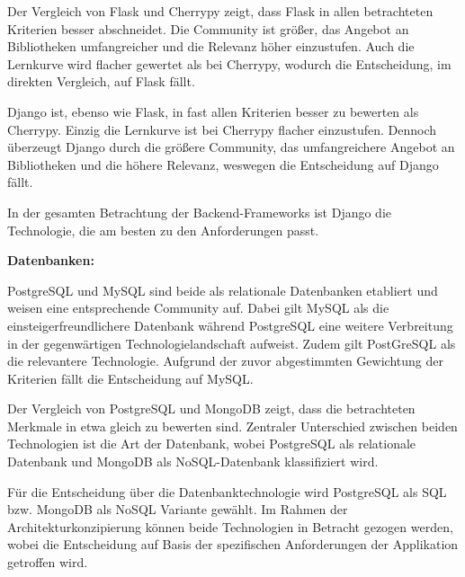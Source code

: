 Der Vergleich von Flask und Cherrypy zeigt, dass Flask in allen betrachteten Kriterien besser abschneidet.
Die Community ist größer, das Angebot an Bibliotheken umfangreicher und die Relevanz höher einzustufen.
Auch die Lernkurve wird flacher gewertet als bei Cherrypy, wodurch die Entscheidung, im direkten Vergleich, auf Flask fällt.

Django ist, ebenso wie Flask, in fast allen Kriterien besser zu bewerten als Cherrypy.
Einzig die Lernkurve ist bei Cherrypy flacher einzustufen.
Dennoch überzeugt Django durch die größere Community, das umfangreichere Angebot an Bibliotheken und die höhere Relevanz, weswegen die Entscheidung auf Django fällt.

In der gesamten Betrachtung der Backend-Frameworks ist Django die Technologie, die am besten zu den Anforderungen passt.

\textbf{Datenbanken:}

PostgreSQL und MySQL sind beide als relationale Datenbanken etabliert und weisen eine entsprechende Community auf.
Dabei gilt MySQL als die einsteigerfreundlichere Datenbank während PostgreSQL eine weitere Verbreitung in der gegenwärtigen Technologielandschaft aufweist.
Zudem gilt PostGreSQL als die relevantere Technologie.
Aufgrund der zuvor abgestimmten Gewichtung der Kriterien fällt die Entscheidung auf MySQL.

Der Vergleich von PostgreSQL und MongoDB zeigt, dass die betrachteten Merkmale in etwa gleich zu bewerten sind.
Zentraler Unterschied zwischen beiden Technologien ist die Art der Datenbank, wobei PostgreSQL als relationale Datenbank und MongoDB als NoSQL-Datenbank klassifiziert wird.

Für die Entscheidung über die Datenbanktechnologie wird PostgreSQL als SQL bzw. MongoDB als NoSQL Variante gewählt.
Im Rahmen der Architekturkonzipierung können beide Technologien in Betracht gezogen werden, wobei die Entscheidung auf Basis der spezifischen Anforderungen der Applikation getroffen wird.



